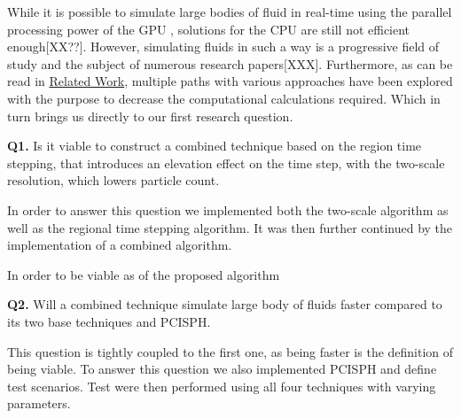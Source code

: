 \documentclass[../../main.tex]{subfiles}
\begin{document}
While it is possible to simulate large bodies of fluid in real-time using the parallel processing power of the GPU \cite{macklin2013position,goswami2010interactive}, solutions for the CPU are still not efficient enough[XX??]. However, simulating fluids in such a way is a progressive field of study and the subject of numerous research papers[XXX]. Furthermore, as can be read in \hyperref[ch:Related Work]{Related Work}, multiple paths with various approaches have been explored with the purpose to decrease the computational calculations required. Which in turn brings us directly to our first research question.

\begin{displayquote}
{\large \textbf{Q1.}} 
Is it viable to construct a combined technique based on the region time stepping, that introduces an elevation effect on the time step, with the two-scale resolution, which lowers particle count.
\end{displayquote} 
In order to answer this question we implemented both the two-scale algorithm as well as the regional time stepping algorithm. It was then further continued by the implementation of a combined algorithm. 

In order to be viable as
of the proposed algorithm 

\begin{displayquote}
{\large \textbf{Q2.}} Will a combined technique simulate large body of fluids faster compared to its two base techniques and PCISPH.
\end{displayquote}
This question is tightly coupled to the first one, as being faster is the definition of being viable. To answer this question we also implemented PCISPH and define test scenarios. Test were then performed using all four techniques with varying parameters.
\end{document}
